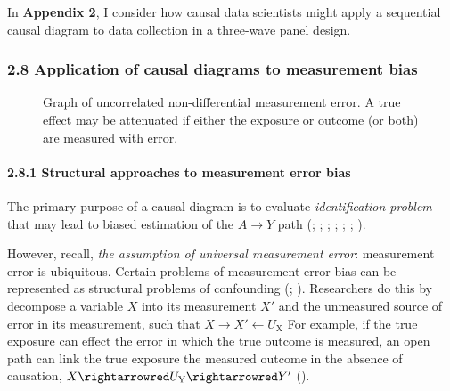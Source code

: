 \documentclass[
  singlecolumn]{article}
\let\oldparagraph\paragraph
\renewcommand{\paragraph}[1]{\oldparagraph{#1}\mbox{}}
\begin{document}
In \textbf{Appendix 2}, I consider how causal data scientists might
apply a sequential causal diagram to data collection in a three-wave
panel design.

\subsubsection{2.8 Application of causal diagrams to measurement
bias}\label{application-of-causal-diagrams-to-measurement-bias}

\begin{figure}


\caption{\label{fig-measure-error}Graph of uncorrelated non-differential
measurement error. A true effect may be attenuated if either the
exposure or outcome (or both) are measured with error.}

\end{figure}%

\paragraph{2.8.1 Structural approaches to measurement error
bias}\label{structural-approaches-to-measurement-error-bias}

The primary purpose of a causal diagram is to evaluate
\emph{identification problem} that may lead to biased estimation of the
\(A \to Y\) path (; ;
;
;
; ; ).

However, recall, \emph{the assumption of universal measurement error}:
measurement error is ubiquitous. Certain problems of measurement error
bias can be represented as structural problems of confounding
(;
).
Researchers do this by decompose a variable \(X\) into its measurement
\(X'\) and the unmeasured source of error in its measurement, such that
\(X \to X' \leftarrow U_{\text{X}}\) For example, if the true exposure
can effect the error in which the true outcome is measured, an open path
can link the true exposure the measured outcome in the absence of
causation, \(X\rightarrowred U_{\text{Y}} \rightarrowred Y'\)
().
\end{document}

